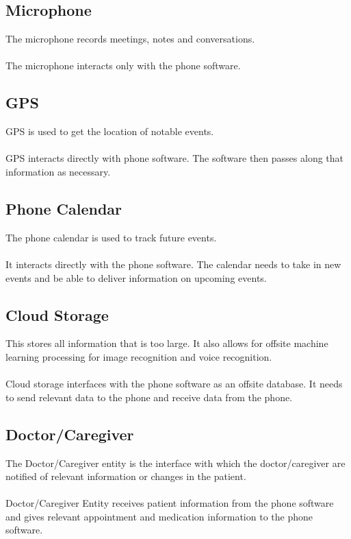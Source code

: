 \documentclass[12pt]{article}
\begin{document}
\begin{multicols}{2}
\subsection*{Microphone}
The microphone records meetings, notes and conversations.\\
\\
The microphone interacts only with the phone software.

\subsection*{GPS}
GPS is used to get the location of notable events. \\
\\
GPS interacts directly with phone software.  The software then passes along that information as necessary.

\subsection*{Phone Calendar}
The phone calendar is used to track future events.\\
\\
It interacts directly with the phone software. The calendar needs to take in new events and be able to deliver information on upcoming events.

\subsection*{Cloud Storage}
This stores all information that is too large.  It also allows for offsite machine learning processing for image recognition and voice recognition.\\
\\
Cloud storage interfaces with the phone software as an offsite database. It needs to send relevant data to the phone and receive data from the phone.

\subsection*{Doctor/Caregiver}
The Doctor/Caregiver entity is the interface with which the doctor/caregiver are notified of relevant information or changes in the patient.\\
\\
Doctor/Caregiver Entity receives patient information from the phone software and gives relevant appointment and medication information to the phone software.


\end{multicols}
\end{document}
